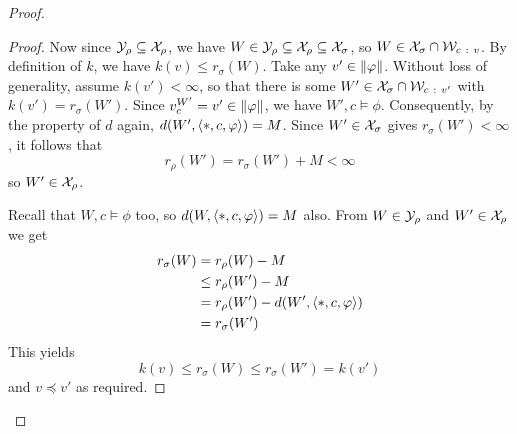 \begin{proof}
\begin{proof}
            Now since $\mathcal{Y}_\rho \subseteq \mathcal{X}_\rho$, we have $W \in \mathcal{Y}_\rho
            \subseteq \mathcal{X}_\rho \subseteq \mathcal{X}_\sigma$, so $W \in \mathcal{X}_\sigma \cap
            \mathcal{W}_{c\ :\  v}$. By definition of $k$, we have $k(v) \le
            r_\sigma(W)$. Take any $v' \in \|{\varphi}\|$. Without loss of
            generality, assume $k(v') < \infty$, so that there is some $W' \in
            \mathcal{X}_\sigma \cap \mathcal{W}_{c\ :\  v'}$ with $k(v') = r_\sigma(W')$. Since
            $v^{W'}_c = v' \in \|{\varphi}\|$, we have $W', c \models \phi$.
            Consequently, by the property of $d$ again, $d(W', \langle {\ast, c,
            \varphi} \rangle) = M$. Since $W' \in \mathcal{X}_\sigma$ gives $r_\sigma(W') <
            \infty$, it follows that
            \[
                r_\rho(W') = r_\sigma(W') + M < \infty
            \]
            so $W' \in \mathcal{X}_\rho$.

            Recall that $W, c \models \phi$ too, so $d(W, \langle {\ast, c,
            \varphi} \rangle) = M$ also. From $W \in \mathcal{Y}_\rho$ and $W' \in \mathcal{X}_\rho$ we get
            \begin{align*}
                r_\sigma(W)
                &= r_\rho(W) - M \\
                &\le r_\rho(W') - M \\
                &= r_\rho(W') - d(W', \langle {\ast, c, \varphi} \rangle) \\
                &= r_\sigma(W')
            \end{align*}
            This yields
            \[
                k(v) \le r_\sigma(W) \le r_\sigma(W') = k(v')
            \]
            and $v \preceq v'$ as required.



\end{proof}
\end{proof}
